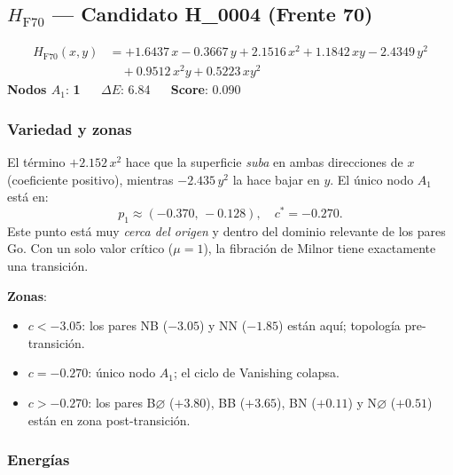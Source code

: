 \documentclass[11pt,a4paper]{article}
\newcommand{\dE}{\Delta E}
\begin{document}
\subsection{\texorpdfstring{$H_{\text{F70}}$}{H\_F70} --- Candidato H\_0004 (Frente 70)}

\begin{tcolorbox}[hambox,title={$H_{\text{F70}}$ (H\_0004, \textcolor{cFrontLow}{Frente 70}) $\cdot$
  $H_1$-max = 0.000 $\cdot$ Rob = 0.000}]
\begin{align*}
  H_{\text{F70}}(x,y) &=
    +1.6437\,x - 0.3667\,y
    + 2.1516\,x^2 + 1.1842\,xy - 2.4349\,y^2 \\
  &\quad + 0.9512\,x^2y + 0.5223\,xy^2
\end{align*}
\textbf{Nodos $A_1$}: \textbf{1} $\quad$
\textbf{$\dE$}: 6.84 $\quad$
\textbf{Score}: 0.090
\end{tcolorbox}

\subsubsection*{Variedad y zonas}

El término $+2.152\,x^2$ hace que la superficie \emph{suba} en ambas
direcciones de $x$ (coeficiente positivo), mientras $-2.435\,y^2$ la
hace bajar en $y$. El único nodo $A_1$ está en:
\[
  p_1\approx(-0.370,\,-0.128),\quad c^*=-0.270.
\]
Este punto está muy \emph{cerca del origen} y dentro del dominio relevante
de los pares Go. Con un solo valor crítico ($\mu=1$), la fibración
de Milnor tiene exactamente una transición.

\textbf{Zonas}:
\begin{itemize}[noitemsep]
  \item $c < -3.05$: los pares NB ($-3.05$) y NN ($-1.85$) están aquí;
        topología pre-transición.
  \item $c = -0.270$: único nodo $A_1$; el ciclo de Vanishing colapsa.
  \item $c > -0.270$: los pares B$\varnothing$ ($+3.80$), BB ($+3.65$),
        BN ($+0.11$) y N$\varnothing$ ($+0.51$) están en zona post-transición.
\end{itemize}

\subsubsection*{Energías}
\end{document}
